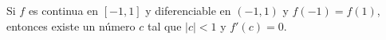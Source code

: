 \item Si $f$ es continua en $[-1, 1]$ y diferenciable en $(-1, 1)$ y $f(-1) = f(1)$, entonces existe un número $c$ tal que $|c| < 1$ y $f'(c) = 0$.
